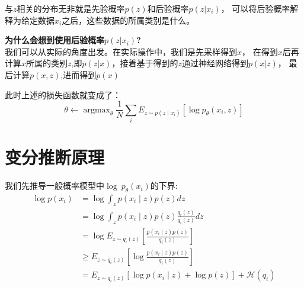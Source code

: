 与$z$相关的分布无非就是先验概率$p(z)$和后验概率$p(z|x_i)$，
可以将后验概率解释为给定数据$x_i$之后，这些数据的所属类别是什么。

\begin{emp_box}
{\bf\noindent
为什么会想到使用后验概率$p(z|x_i)$?}
\\
我们可以从实际的角度出发。在实际操作中，我们是先采样得到$x$，
在得到$x$后再计算$x$所属的类别$z$,即$p(z|x)$，接着基于得到的$z$通过神经网络得到$p(x|z)$，
最后计算$p(x,z)$,进而得到$p(x)$
\end{emp_box}
此时上述的损失函数就变成了：
$$
\theta \leftarrow \operatorname{argmax}_{\theta} \frac{1}{N} \sum_{i} E_{z \sim p\left(z \mid x_{i}\right)}\left[\log p_{\theta}\left(x_{i}, z\right)\right]
$$


\section{变分推断原理}

我们先推导一般概率模型中$\log\ p_\theta(x_i)$的下界:
$$
\begin{aligned}
\log p\left(x_{i}\right) &=\log \int_{z} p\left(x_{i} \mid z\right) p(z) d z \\
&=\log \int_{z} p\left(x_{i} \mid z\right) p(z) \frac{q_{i}(z)}{q_{i}(z)} d z \\
&=\log E_{z \sim q_{i}(z)}\left[\frac{p\left(x_{i} \mid z\right) p(z)}{q_{i}(z)}\right]  \\
&\geq E_{z \sim q_{i}(z)}\left[\log \frac{p\left(x_{i} \mid z\right) p(z)}{q_{i}(z)}\right] \\
&=E_{z \sim q_{i}(z)}\left[\log p\left(x_{i} \mid z\right)+\log p(z)\right]+\mathcal{H}\left(q_{i}\right)
\end{aligned}
$$

